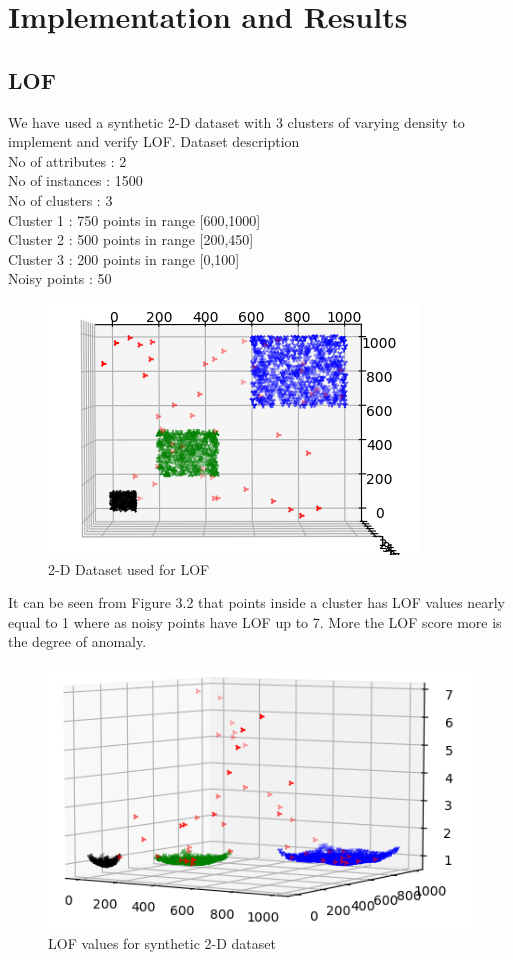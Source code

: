 \chapter{Implementation and Results}\label{Implementation and Results}

\section{LOF}
We have used a synthetic 2-D dataset with 3 clusters of varying density to implement and verify LOF.
Dataset description\\
No of attributes : 2\\
No of instances  : 1500\\
No of clusters   : 3\\
Cluster 1        :  750 points in range [600,1000] \\
Cluster 2        :  500 points in range [200,450] \\
Cluster 3        :  200 points in range [0,100] \\
Noisy points	 : 50

\begin{figure}[h!]
	\centering
	\includegraphics{chap03/LOF_dataset.png}
	\caption{2-D Dataset used for LOF}
\end{figure}

It can be seen from Figure 3.2 that points inside a cluster has LOF values nearly equal to 1 where as noisy points have LOF up to 7. More the LOF score more is the degree of anomaly.

\begin{figure}[h!]
	\centering
	\includegraphics{chap03/LOF_result.png}
	\caption{LOF values for synthetic 2-D dataset}
\end{figure}



  

